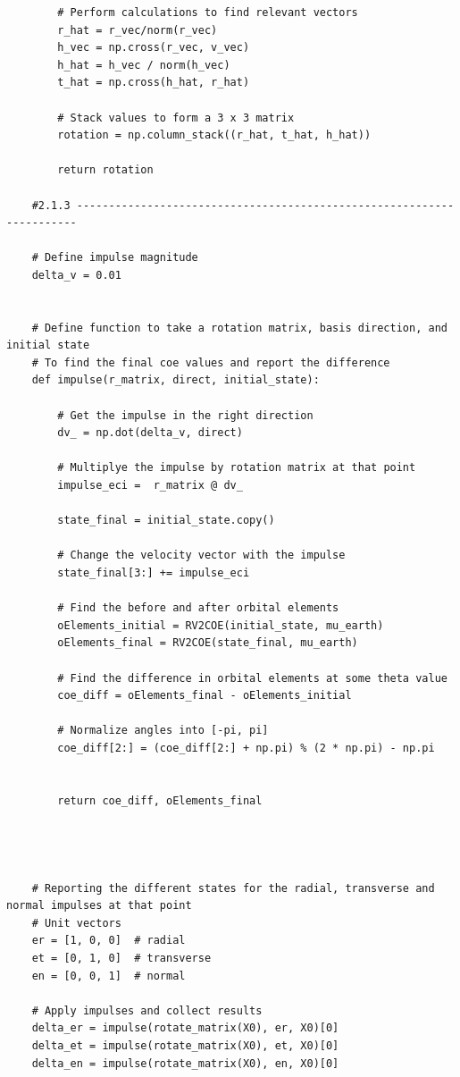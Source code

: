 \documentclass[12pt,twocolumn]{article}  %
\begin{document}
\begin{lstlisting}
        # Perform calculations to find relevant vectors
        r_hat = r_vec/norm(r_vec)
        h_vec = np.cross(r_vec, v_vec)
        h_hat = h_vec / norm(h_vec)  
        t_hat = np.cross(h_hat, r_hat)  
        
        # Stack values to form a 3 x 3 matrix 
        rotation = np.column_stack((r_hat, t_hat, h_hat))
        
        return rotation
    
    #2.1.3 ----------------------------------------------------------------------
    
    # Define impulse magnitude
    delta_v = 0.01
    
    
    # Define function to take a rotation matrix, basis direction, and initial state
    # To find the final coe values and report the difference  
    def impulse(r_matrix, direct, initial_state):
        
        # Get the impulse in the right direction
        dv_ = np.dot(delta_v, direct)
        
        # Multiplye the impulse by rotation matrix at that point
        impulse_eci =  r_matrix @ dv_
        
        state_final = initial_state.copy()
        
        # Change the velocity vector with the impulse
        state_final[3:] += impulse_eci
        
        # Find the before and after orbital elements
        oElements_initial = RV2COE(initial_state, mu_earth)
        oElements_final = RV2COE(state_final, mu_earth)
        
        # Find the difference in orbital elements at some theta value 
        coe_diff = oElements_final - oElements_initial
        
        # Normalize angles into [-pi, pi]
        coe_diff[2:] = (coe_diff[2:] + np.pi) % (2 * np.pi) - np.pi
        
        
        return coe_diff, oElements_final
        
        
    
    
    # Reporting the different states for the radial, transverse and normal impulses at that point
    # Unit vectors
    er = [1, 0, 0]  # radial
    et = [0, 1, 0]  # transverse
    en = [0, 0, 1]  # normal
    
    # Apply impulses and collect results
    delta_er = impulse(rotate_matrix(X0), er, X0)[0]
    delta_et = impulse(rotate_matrix(X0), et, X0)[0]
    delta_en = impulse(rotate_matrix(X0), en, X0)[0]
    

\end{lstlisting}
\end{document}
